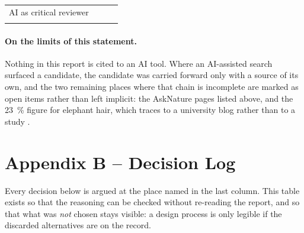 \begin{longtable}{L{2.4cm} L{3.0cm} L{4.6cm} L{4.2cm}}
AI as critical reviewer &  &
 &
 \\

 & \todo{} & \todo{} & \todo{} \\
\end{longtable}

\paragraph{On the limits of this statement.} Nothing in this report is cited to
an AI tool. Where an AI-assisted search surfaced a candidate, the candidate was
carried forward only with a source of its own, and the two remaining places where
that chain is incomplete are marked as open items rather than left implicit: the
AskNature pages listed above, and the \qty{23}{\percent} figure for elephant
hair, which traces to a university blog rather than to a study
\parencite{notredame_elephant}.

\section*{Appendix B -- Decision Log}

Every decision below is argued at the place named in the last column. This table
exists so that the reasoning can be checked without re-reading the report, and
so that what was \emph{not} chosen stays visible: a design process is only
legible if the discarded alternatives are on the record.

\renewcommand{\thetable}{B.\arabic{table}}
\setcounter{table}{0}

